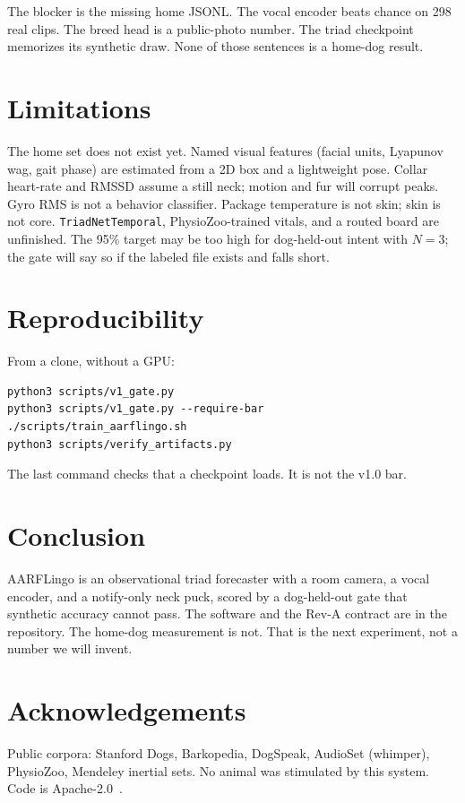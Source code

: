 \documentclass[11pt]{article}
\begin{document}
The blocker is the missing home JSONL.
The vocal encoder beats chance on 298 real clips.
The breed head is a public-photo number.
The triad checkpoint memorizes its synthetic draw.
None of those sentences is a home-dog result.

\section{Limitations}

The home set does not exist yet.
Named visual features (facial units, Lyapunov wag, gait phase) are estimated from a 2D box and a
lightweight pose.
Collar heart-rate and RMSSD assume a still neck; motion and fur will corrupt peaks.
Gyro RMS is not a behavior classifier.
Package temperature is not skin; skin is not core.
\texttt{TriadNetTemporal}, PhysioZoo-trained vitals, and a routed board are unfinished.
The 95\% target may be too high for dog-held-out intent with $N=3$; the gate will say so if the
labeled file exists and falls short.

\section{Reproducibility}

From a clone, without a GPU:
\begin{verbatim}
python3 scripts/v1_gate.py
python3 scripts/v1_gate.py --require-bar
./scripts/train_aarflingo.sh
python3 scripts/verify_artifacts.py
\end{verbatim}
The last command checks that a checkpoint loads.
It is not the v1.0 bar.

\section{Conclusion}

AARFLingo is an observational triad forecaster with a room camera, a vocal encoder, and a
notify-only neck puck, scored by a dog-held-out gate that synthetic accuracy cannot pass.
The software and the Rev-A contract are in the repository.
The home-dog measurement is not.
That is the next experiment, not a number we will invent.

\section*{Acknowledgements}

Public corpora: Stanford Dogs, Barkopedia, DogSpeak, AudioSet (whimper), PhysioZoo, Mendeley inertial sets.
No animal was stimulated by this system.
Code is Apache-2.0~\citep{aarflingo2026}.



\end{document}
